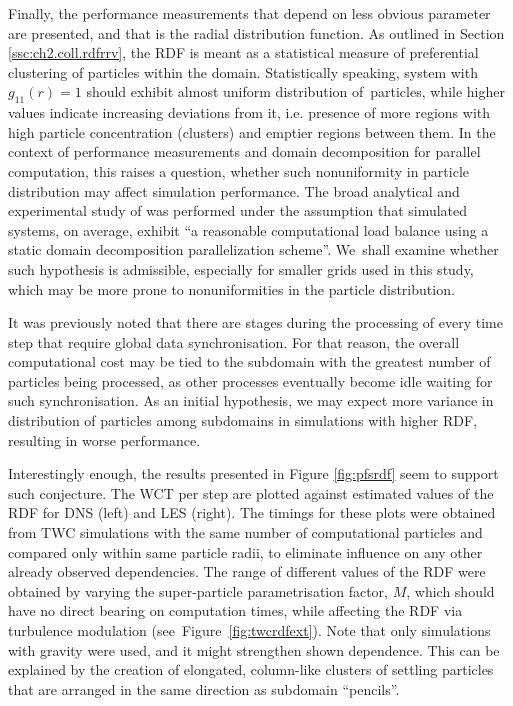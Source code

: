 \documentclass{pracamgren}
\begin{document}
Finally, the performance measurements that depend on less obvious parameter are presented, and that is the radial distribution function.
As outlined in Section \ref{ssc:ch2.coll.rdfrrv}, the RDF is meant as a statistical measure of preferential clustering of particles within the domain.
Statistically speaking, system with $g_{11}(r) = 1$ should exhibit almost uniform distribution of~particles, while higher values indicate increasing deviations from it, i.e. presence of more regions with high particle concentration (clusters) and emptier regions between them.
In the context of performance measurements and domain decomposition for parallel computation, this raises a question, whether such nonuniformity in particle distribution may affect simulation performance.
The broad analytical and experimental study of \textcite{Ayala2014} was performed under the assumption that simulated systems, on average, exhibit ``a reasonable computational load balance using a static domain decomposition parallelization scheme''.
We~shall examine whether such hypothesis is admissible, especially for smaller grids used in this study, which may be more prone to nonuniformities in the particle distribution.

It was previously noted that there are stages during the processing of every time step that require global data synchronisation.
For that reason, the overall computational cost may be tied to the subdomain with the greatest number of particles being processed, as other processes eventually become idle waiting for such synchronisation.
As an initial hypothesis, we may expect more variance in distribution of particles among subdomains in simulations with higher RDF, resulting in worse performance.

Interestingly enough, the results presented in Figure \ref{fig:pfsrdf} seem to support such conjecture.
The WCT per step are plotted against estimated values of the RDF for DNS (left) and LES (right).
The timings for these plots were obtained from TWC simulations with the same number of computational particles and compared only within same particle radii, to eliminate influence on any other already observed dependencies.
The range of different values of the RDF were obtained by varying the super-particle parametrisation factor, $M$, which should have no direct bearing on computation times, while affecting the RDF via turbulence modulation (see~Figure~\ref{fig:twcrdfext}). 
Note that only simulations with gravity were used, and it might strengthen shown dependence.
This can be explained by the creation of elongated, column-like clusters of settling particles that are arranged in the same direction as subdomain ``pencils''.
\end{document}
